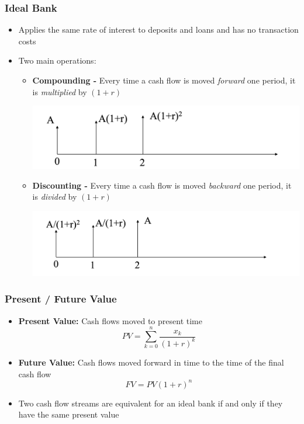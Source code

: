 \documentclass[11pt]{article}
\begin{document}
\subsubsection{Ideal Bank}
\begin{itemize}
\item Applies the same rate of interest to deposits and loans and has no transaction costs 
\item Two main operations:
\begin{itemize}
\item \textbf{Compounding -} Every time a cash flow is moved \textit{forward} one period, it is \textit{multiplied} by $(1+r)$
\begin{center}
\includegraphics[scale=0.3]{images/compounding.png} 
\end{center}
\item \textbf{Discounting -} Every time a cash flow is moved \textit{backward} one period, it is \textit{divided} by $(1+r)$
\begin{center}
\includegraphics[scale=0.3]{images/discounting.png} 
\end{center}
\end{itemize}
\end{itemize}

\subsubsection{Present / Future Value}
\begin{itemize}
\item \textbf{Present Value:} Cash flows moved to present time 
$$ PV = \sum_{k=0}^{n} \frac{x_k}{(1+r)^k}$$
\item \textbf{Future Value:} Cash flows moved forward in time to the time of the final cash flow
$$ FV = PV (1+r)^n$$
\item Two cash flow streams are equivalent for an ideal bank if and only if they have the same present value 
\end{itemize}
\end{document}
